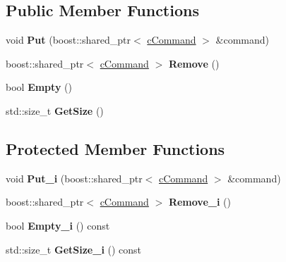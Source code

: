 \subsection*{\-Public \-Member \-Functions}
\begin{DoxyCompactItemize}
\item 
\hypertarget{classengine_1_1cCommandQueue_a2e7c11da33e9d8f35bcfa78fe684d2e4}{void {\bfseries \-Put} (boost\-::shared\-\_\-ptr$<$ \hyperlink{classengine_1_1cCommand}{c\-Command} $>$ \&command)}\label{classengine_1_1cCommandQueue_a2e7c11da33e9d8f35bcfa78fe684d2e4}

\item 
\hypertarget{classengine_1_1cCommandQueue_ae868e6227a60664fdc0d04346dd625e2}{boost\-::shared\-\_\-ptr$<$ \hyperlink{classengine_1_1cCommand}{c\-Command} $>$ {\bfseries \-Remove} ()}\label{classengine_1_1cCommandQueue_ae868e6227a60664fdc0d04346dd625e2}

\item 
\hypertarget{classengine_1_1cCommandQueue_a727d36f68de37caba84869e3f973ccbc}{bool {\bfseries \-Empty} ()}\label{classengine_1_1cCommandQueue_a727d36f68de37caba84869e3f973ccbc}

\item 
\hypertarget{classengine_1_1cCommandQueue_af6b95fb876418671d6285ee368abca25}{std\-::size\-\_\-t {\bfseries \-Get\-Size} ()}\label{classengine_1_1cCommandQueue_af6b95fb876418671d6285ee368abca25}

\end{DoxyCompactItemize}
\subsection*{\-Protected \-Member \-Functions}
\begin{DoxyCompactItemize}
\item 
\hypertarget{classengine_1_1cCommandQueue_aeb88bbb3ee34d79b6498c1077fe051c8}{void {\bfseries \-Put\-\_\-i} (boost\-::shared\-\_\-ptr$<$ \hyperlink{classengine_1_1cCommand}{c\-Command} $>$ \&command)}\label{classengine_1_1cCommandQueue_aeb88bbb3ee34d79b6498c1077fe051c8}

\item 
\hypertarget{classengine_1_1cCommandQueue_a410cb146fd123de1766bf8fee2827485}{boost\-::shared\-\_\-ptr$<$ \hyperlink{classengine_1_1cCommand}{c\-Command} $>$ {\bfseries \-Remove\-\_\-i} ()}\label{classengine_1_1cCommandQueue_a410cb146fd123de1766bf8fee2827485}

\item 
\hypertarget{classengine_1_1cCommandQueue_a7c8a6bd8dae5c050634cededcb77ef4d}{bool {\bfseries \-Empty\-\_\-i} () const }\label{classengine_1_1cCommandQueue_a7c8a6bd8dae5c050634cededcb77ef4d}

\item 
\hypertarget{classengine_1_1cCommandQueue_a2b729f6d9866c6e9b50e142f7e475b05}{std\-::size\-\_\-t {\bfseries \-Get\-Size\-\_\-i} () const }\label{classengine_1_1cCommandQueue_a2b729f6d9866c6e9b50e142f7e475b05}

\end{DoxyCompactItemize}
